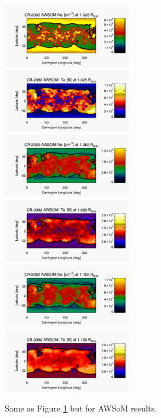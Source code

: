 \documentclass[namedreferences]{solarphysics}
\begin{document}
\begin{article}
\begin{figure}[h!]
\begin{center}
\includegraphics[width=0.495\textwidth]{figs/map_Ne_awsom_2082_185_short_1025_Rsun.pdf}
\includegraphics[width=0.495\textwidth]{figs/map_Te_awsom_2082_185_short_1025_Rsun.pdf}
\includegraphics[width=0.495\textwidth]{figs/map_Ne_awsom_2082_185_short_1065_Rsun.pdf}
\includegraphics[width=0.495\textwidth]{figs/map_Te_awsom_2082_185_short_1065_Rsun.pdf}
\includegraphics[width=0.495\textwidth]{figs/map_Ne_awsom_2082_185_short_1105_Rsun.pdf}
\includegraphics[width=0.495\textwidth]{figs/map_Te_awsom_2082_185_short_1105_Rsun.pdf}
\caption{Same as Figure \ref{carmaps_awsom_2082} but for AWSoM results.}
\label{carmaps_awsom_2082}
\end{center}
\end{figure}


\end{article}
\end{document}
